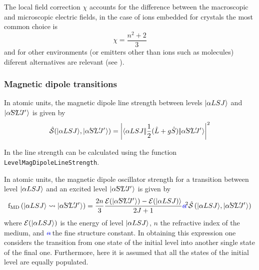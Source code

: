 \documentclass{article}
\newcommand{\codetext}[1]{{\color{BlueViolet} \texttt{#1}}}
\begin{document}
The local field correction $\chi$ accounts for the difference between the macroscopic and microscopic electric fields, in the case of ions embedded for crystals the most common choice is 
\begin{equation}
	\chi = \frac{n^2+2}{3}  
\end{equation}
and for other environments (or emitters other than ions such as molecules) diferent alternatives are relevant (see \cite{duan_dependence_2006}).


\subsubsection{Magnetic dipole transitions}

In atomic units, the magnetic dipole line strength between levels $|\alpha{LSJ}\rangle$ and $\ket{\alpha\mathrlap{'} S\mathrlap{'} L\mathrlap{'} J\mathrlap{'}\,\,}$ is given by
\begin{equation} 
	\lineStrength(\ket{\alpha{LSJ}},\ket{\alpha\mathrlap{'} S\mathrlap{'} L\mathrlap{'} J\mathrlap{'}\,\,}) = 
	\left|\redbraopket{\alpha{LSJ}}{\frac{1}{2}(\op{L}+g \op{S})}{\alpha\mathrlap{'} S\mathrlap{'} L\mathrlap{'} J\mathrlap{'}\,\,} \right|^2
\end{equation}

In \qlanth the line strength can be calculated using the function \codetext{LevelMagDipoleLineStrength}.

 

In atomic units, the magnetic dipole oscillator strength for a transition between level $|\alpha{LSJ}\rangle$ and an excited level $\ket{\alpha\mathrlap{'} S\mathrlap{'} L\mathrlap{'} J\mathrlap{'}\,\,}$ is given by \cite{rudzikas_theoretical_2007}
\begin{equation} 
	\oStrength{MD}{\alpha{LSJ}}{\alpha\mathrlap{'} S\mathrlap{'} L\mathrlap{'} J\mathrlap{'}\,\,} = \frac{2 n}{3}
	\frac{
	\mathcal{E}(
		\ket{\alpha\mathrlap{'}
			S\mathrlap{'}
			L\mathrlap{'}
			J\mathrlap{'}\,\,})-
	\mathcal{E}(
		\ket{\alpha{LSJ}
		)}}
	{2J+1}
	\alphaFine^2
	\lineStrength\left(\ket{\alpha{LSJ}},\ket{\alpha\mathrlap{'} S\mathrlap{'} L\mathrlap{'} J\mathrlap{'}\,\,}\right)
\end{equation}
where $\mathcal{E}(|\alpha{LSJ}\rangle)$ is the energy of level $|\alpha{LSJ}\rangle$, $n$ the refractive index of the medium, and $\alphaFine$ the fine structure constant. In obtaining this expression one considers the transition from one state of the initial level into another single state of the final one. Furthermore, here it is assumed that all the states of the initial level are equally populated.
\end{document}

